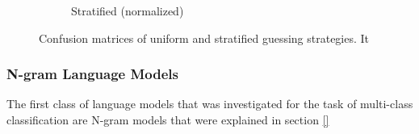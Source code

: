 \begin{figure}[h]
\begin{subfigure}[b]{0.48\textwidth}
        \caption{Stratified (normalized)}
        \label{fig:exp-vector-space-conf-matrix-guessing-stratified-normalized}
    \end{subfigure}
    \caption{Confusion matrices of uniform and stratified guessing strategies. It  }
  \label{fig:exp-vector-space-conf-matrix-guessing}
\end{figure}

\subsubsection{N-gram Language Models}
\label{subs:n-gram-language-models}

The first class of language models that was investigated for the task of multi-class classification are N-gram models that were explained in section \ref{}



%
%
%
%
%
%
%
%
%
%
%
%
%
